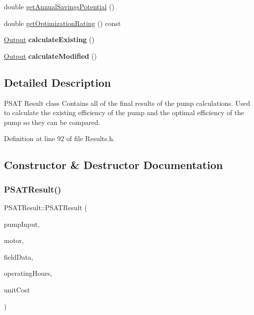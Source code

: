 \begin{DoxyCompactItemize}
\item 
double \hyperlink{class_p_s_a_t_result_ab318975db5ccdb0b7786e09a3fdff06b}{get\+Annual\+Savings\+Potential} ()
\item 
double \hyperlink{class_p_s_a_t_result_aa0a7001461408fcb06a6c22ce2d064db}{get\+Optimization\+Rating} () const
\item 
\mbox{\label{class_p_s_a_t_result_ae0182176bc2f885c6904c79ac6e16055}} 
\hyperlink{struct_p_s_a_t_result_1_1_output}{Output} {\bfseries calculate\+Existing} ()
\item 
\mbox{\label{class_p_s_a_t_result_a89768689e74a09adfa1d4766fce3b30a}} 
\hyperlink{struct_p_s_a_t_result_1_1_output}{Output} {\bfseries calculate\+Modified} ()
\end{DoxyCompactItemize}


\subsection{Detailed Description}
P\+S\+AT Result class Contains all of the final results of the pump calculations. Used to calculate the existing efficiency of the pump and the optimal efficiency of the pump so they can be compared. 

Definition at line 92 of file Results.\+h.



\subsection{Constructor \& Destructor Documentation}
\mbox{\label{class_p_s_a_t_result_ad876fe5e1d3da3ad28ccfb6c81f34a98}} 
\subsubsection{\texorpdfstring{P\+S\+A\+T\+Result()}{PSATResult()}\hspace{0.1cm}{\footnotesize\ttfamily [1/3]}}
{\footnotesize\ttfamily P\+S\+A\+T\+Result\+::\+P\+S\+A\+T\+Result (\begin{DoxyParamCaption}\item[{\hyperlink{struct_pump_1_1_input}{Pump\+::\+Input} \&}]{pump\+Input,  }\item[{\hyperlink{struct_motor}{Motor} \&}]{motor,  }\item[{\hyperlink{struct_pump_1_1_field_data}{Pump\+::\+Field\+Data} \&}]{field\+Data,  }\item[{double}]{operating\+Hours,  }\item[{double}]{unit\+Cost }\end{DoxyParamCaption})\hspace{0.3cm}{\ttfamily [inline]}}

